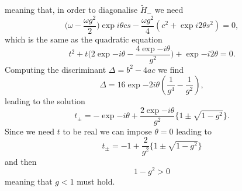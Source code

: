 \documentclass{_mypackages/monograph}
\begin{document}
meaning that, in order to diagonalise \(\tilde{H}_-\) we need
\begin{equation}
    \big( \omega-\frac{\omega g^2}{2}\big) \exp{i\theta}cs - \frac{\omega g^2}{4} (c^2 + \exp{i2\theta} s^2) = 0,
\end{equation}
which is the same as the quadratic equation
\begin{equation}
    t^2 + t\big(2\exp{-i\theta} - \frac{4\exp{-i\theta}}{g^2} \big) + \exp{-i2\theta} =0.
\end{equation}
Computing the discriminant \(\Delta = b^2 - 4ac\) we find
\begin{equation}
    \Delta = 16\exp{-2i\theta}\left(\frac{1}{g^4} - \frac{1}{g^2} \right),
\end{equation}
leading to the solution
\begin{equation}
    t_\pm = -\exp{-i\theta} + \frac{2\exp{-i\theta}}{g^2} \Big\{1 \pm \sqrt{1-g^2}\Big\}.
\end{equation}
Since we need \(t\) to be real we can impose \(\theta=0\) leading to
\begin{equation}
    t_\pm = -1 + \frac{2}{g^2} \Big\{1 \pm \sqrt{1-g^2}\Big\}
\end{equation}
and then
\begin{equation}
    1-g^2 > 0
\end{equation}
meaning that \(g<1\) must hold.




























































\end{document}
